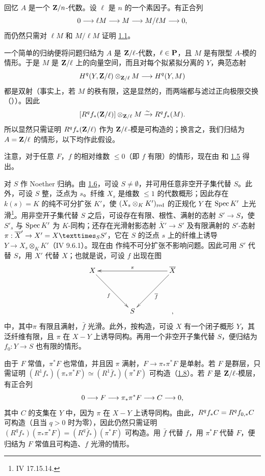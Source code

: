 回忆 $A$ 是一个 $\mathbf{Z}/n$-代数。设 $\ell$ 是 $n$ 的一个素因子。有正合列
$$
0\longrightarrow \ell M\longrightarrow M\longrightarrow M/\ell
M\longrightarrow 0{},
$$
而仍然只需对 $\ell M$ 和 $M/\ell M$ 证明 \hyperref[XIV.thm1.1]{1.1}。

一个简单的归纳便将问题归结为 $A$ 是 $\mathbf{Z}/\ell$-代数，$\ell\in\mathbf{P}$，且 $M$ 是有限型 $A$-模的情形。于是 $M$ 是 $\mathbf{Z}/\ell$ 上的向量空间，而且对每个拟紧拟分离的 $Y$，典范态射
$$
H^q(Y,\mathbf{Z}/\ell)\otimes_{\mathbf{Z}/\ell}M\longrightarrow H^q(Y,M)
$$
都是双射（事实上，若 $M$ 的秩有限，这是显然的，而两端都与滤过正向极限交换\pageoriginale （））。因此
$$
[R^qf_{\ast}(\mathbf{Z}/\ell)]\otimes_{\mathbf{Z}/\ell}M\xrightarrow{\sim}
R^qf_{\ast}(M){}.
$$
所以显然只需证明 $R^qf_{\ast}(\mathbf{Z}/\ell)$ 作为 $\mathbf{Z}/\ell$-模是可构造的；换言之，我们归结为 $A=\mathbf{Z}/\ell$ 的情形，以下均作此假设。

注意，对于任意 $F$，$f$ 的相对维数 $\leq0$（即 $f$ 有限）的情形，现在由  和 \hyperref[XIV.lem1.5]{1.5} 得出。

对 $S$ 作 Noether 归纳。由 \hyperref[XIV.lem1.6]{1.6}，可设 $S\neq∅$，并可用任意非空开子集代替 $S$。此外，可设 $S$ 整，泛点为 $s$。纤维 $X_s$ 是维数 $\leq1$ 的代数概形；因此存在 $k(s)=K$ 的纯不可分扩张 $K'$，使 $(X_s\otimes_KK')_{\text{\rm red}}$ 的正规化 $Y$ 在 $\operatorname{Spec} K'$ 上光滑\footnote[1]{\Cf \EGA IV 17.15.14.}。用非空开子集代替 $S$ 之后，可设存在有限、根性、满射的态射 $S'\rightarrow S$，使 $S'_s$ 与 $\operatorname{Spec} K'$ 为 $K$-同构；还存在光滑射影态射 $\bar{X}'\rightarrow S'$ 及有限满射的 $S'$-态射 $\pi:\bar{X}'\rightarrow X'=\fprod{X}{S'}{S}$，它在 $S$ 的泛点 $s$ 上的纤维上诱导 $Y\rightarrow X_s\otimes_KK'$（\EGA IV 9.6.1）。现在由 作纯不可分扩张不影响问题。因此可用 $S'$ 代替 $S$，用 $X'$ 代替 $X$；也就是说，可设 $f$ 出现在图
$$
\xymatrix@=1.5cm{
X   \ar[rd]_{f}& &\bar{X} \ar[ll]_{\pi} \ar[ld]^{\bar{f}}\\
         &         S        &           ,
}
$$
中，其中\pageoriginale $\pi$ 有限且满射，$\bar f$ 光滑。此外，按构造，可设 $X$ 有一个闭子概形 $Y$，其泛纤维有限，且 $\pi$ 在 $X-Y$ 上诱导同构。再用一个非空开子集代替 $S$，便归结为 $f_0:Y\rightarrow S$ 也有限的情形。

由于 $F$ 常值，$\pi^{\ast}F$ 也常值，并且因 $\pi$ 满射，$F\rightarrow\pi_{\ast}\pi^{\ast}F$ 是单射。若 $F$ 是群层，只需证明 $(R^1f_{\ast})(\pi_{\ast}\pi^{\ast}F)\simeq (R^1\bar f_{\ast})(\pi^{\ast}F)$ 可构造（\hyperref[XIV.lem1.8]{1.8}）。若 $F$ 是 $\mathbf{Z}/\ell$-模层，有正合列
$$
0\longrightarrow F\longrightarrow\pi_{\ast}\pi^{\ast}F\longrightarrow
C\longrightarrow0{},
$$
其中 $C$ 的支集在 $Y$ 中，因为 $\pi$ 在 $X-Y$ 上诱导同构。由此，$R^qf_{\ast}C=R^qf_{0,\ast}C$ 可构造（且当 $q>0$ 时为零），因此仍然只需证明 $(R^qf_{\ast})(\pi_{\ast}\pi^{\ast}F)= (R^q\bar f_{\ast})(\pi^{\ast}F)$ 可构造。用 $\bar f$ 代替 $f$，用 $\pi^{\ast}F$ 代替 $F$，便归结为 $F$ 常值且可构造、$f$ 光滑的情形。

